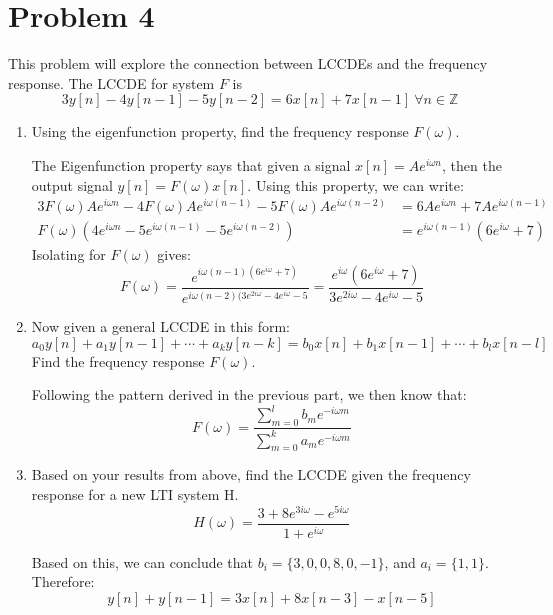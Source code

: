 \documentclass[10pt]{article}
\begin{document}
	\section*{Problem 4}
	This problem will explore the connection between LCCDEs and the frequency response. The LCCDE for system \( F \) 
	is
	\[
		3y[n] - 4y[n - 1] - 5y[n -2]  = 6x[n] + 7x[n-1] \ \forall n \in \mathbb Z
	\] 
	\begin{enumerate}[label=\alph*)]
		\item Using the eigenfunction property, find the frequency response \( F( \omega) \).

			\begin{solution}
				The Eigenfunction property says that given a signal  \( x[n] = Ae^{i \omega n} \), then the 
				output signal \( y[n] = F(\omega)x[n]\). Using this property, we can write:
				\begin{align*}
					3F(\omega) Ae^{i \omega n } - 4F(\omega) Ae^{i \omega (n - 1)} - 5F(\omega) Ae^{ i \omega (n - 2)}
					&= 6Ae^{ i \omega n} + 7Ae^{i \omega (n -1)} \\
					F(\omega)\left( 4e^{i \omega n} - 5e^{i \omega (n - 1)} - 5e^{i \omega (n - 2)} \right) 
					&= e^{i \omega(n -1)}(6e^{i \omega} + 7)
				\end{align*}
				Isolating for \( F(\omega)  \) gives:
				\[
				F(\omega) = \frac{e^{i \omega(n - 1)(6e^{i \omega} + 7)}}{e^{i \omega(n - 2) (3e^{2 i \omega} - 
				4e^{i \omega} - 5}} = \frac{e^{i \omega}(6e^{i \omega} + 7)}{3e^{2 i \omega} - 4e^{ i \omega} - 5}
				\] 
			\end{solution}
		\item Now given a general LCCDE in this form:
			\[
				a_0y[n] + a_1y[n -1] + \cdots + a_k y[n -k] = b_0x[n] + b_1x[n -1] + \cdots + b_l x[n -l]
			\] 
			Find the frequency response \( F(\omega) \). 

			\begin{solution}
				Following the pattern derived in the previous part, we then know that: 
				\[
				F(\omega) = \frac{\sum_{m = 0}^{l} b_me^{-i \omega m}}{\sum_{m = 0}^{k}a_m e^{-i \omega m}}
				\] 
			\end{solution}
		\item Based on your results from above, find the LCCDE given the frequency response for a new LTI system 
			H. 
			\[
			H(\omega) = \frac{3 + 8e^{3i \omega} - e^{5i\omega}}{1 + e^{i \omega}}
			\] 

			\begin{solution}
				Based on this, we can conclude that \( b_i = \{3, 0, 0, 8, 0, -1\}  \), and 
				\( a_i = \{1, 1\}  \). Therefore: 
				\[
					y[n] + y[n - 1] = 3x[n] + 8x[n - 3] - x[n - 5]
				\] 
			\end{solution}
	\end{enumerate}
	\pagebreak
\end{document}

